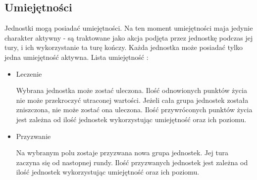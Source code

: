 \documentclass[letterpaper,12pt]{article}
\begin{document}
\subsection{Umiejętności}

Jednostki mogą posiadać umiejętności. Na ten moment umiejętności maja jedynie charakter aktywny - są traktowane jako akcja podjęta przez jednostkę podczas jej tury, i ich wykorzystanie ta turę kończy. Każda jednostka może posiadać tylko jedna umiejętność aktywna.
Lista umiejętność : 
\begin{itemize}
\item Leczenie
\par Wybrana jednostka może zostać uleczona. Ilość odnowionych punktów życia nie może przekroczyć utraconej wartości. Jeżeli cała grupa jednostek została zniszczona, nie może zostać ona uleczona. Ilość przywróconych punktów życia jest zależna od ilość jednostek wykorzystując umiejętność oraz ich poziomu.
\item Przyzwanie
\par Na wybranym polu zostaje przyzwana nowa grupa jednostek. Jej tura zaczyna się od nastopnej rundy. Ilość przyzwanych jednostek jest zależna od ilość jednostek wykorzystując umiejętność oraz ich poziomu.
\end{itemize}
\end{document}
